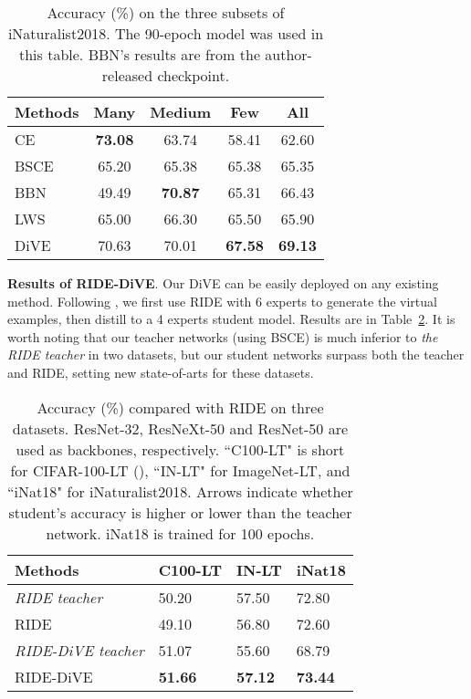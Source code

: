 \documentclass[10pt,twocolumn,letterpaper]{article}
\begin{document}
\begin{table}
   \caption{Accuracy (\%) on the three subsets of iNaturalist2018. The 90-epoch model was used in this table. BBN's results are from the author-released checkpoint.}
   \centering
   \small
      \begin{tabular}{l|cccc}
      \hline
      Methods & Many & Medium & Few & All \\
      \hline \hline
      CE & \textbf{73.08} & 63.74 & 58.41 & 62.60 \\
      BSCE & 65.20 & 65.38 & 65.38 & 65.35 \\
      \hline
      BBN~\cite{zhou2020BBN} & 49.49 & \textbf{70.87} & 65.31 & 66.43\\
      LWS~\cite{kang2019decoupling} & 65.00 & 66.30 & 65.50 & 65.90 \\
      \hline
      DiVE & 70.63 & 70.01 & \textbf{67.58} & \textbf{69.13}\\
      \hline
      \end{tabular}
   \label{iNat18_splits_results_table}
\end{table}

\textbf{Results of RIDE-DiVE}. Our DiVE can be easily deployed on any existing method. Following \cite{wang2020long}, we first use RIDE with 6 experts to generate the virtual examples, then distill to a 4 experts student model. Results are in Table~\ref{RIDE_comparison_results_table}. It is worth noting that our teacher networks (using BSCE) is much inferior to \emph{the RIDE teacher} in two datasets, but our student networks surpass both the teacher and RIDE, setting new state-of-arts for these datasets.

\begin{table}
   \caption{Accuracy (\%) compared with RIDE \cite{wang2020long} on three datasets. ResNet-32, ResNeXt-50 and ResNet-50 are used as backbones, respectively. ``C100-LT" is short for CIFAR-100-LT (), ``IN-LT" for ImageNet-LT, and ``iNat18" for iNaturalist2018. Arrows indicate whether student's accuracy is higher or lower than the teacher network. iNat18 is trained for 100 epochs.}
   \centering
   \small
      \begin{tabular}{l|lll}
      \hline
      Methods & C100-LT & IN-LT & iNat18  \\
      \hline \hline
      \emph{RIDE teacher} & 50.20 & 57.50 & 72.80 \\
      RIDE \cite{wang2020long} & 49.10  &  56.80  & 72.60  \\
      \hline
      \emph{RIDE-DiVE teacher} & 51.07 & 55.60& 68.79 \\
      RIDE-DiVE & \textbf{51.66}  & \textbf{57.12}  & \textbf{73.44} \\
      \hline
      \end{tabular}
   \label{RIDE_comparison_results_table}
\end{table}
\end{document}

